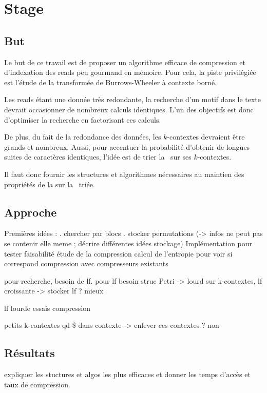 \section{Stage}

\subsection{But}
Le but de ce travail est de proposer un algorithme efficace de compression et d'indexation des reads peu gourmand en mémoire. Pour cela, la piste privilégiée est l'étude de la transformée de Burrows-Wheeler à contexte borné. 

Les reads étant une donnée très redondante, la recherche d'un motif dans le texte devrait occasionner de nombreux calculs identiques. L'un des objectifs est donc d'optimiser la recherche en factorisant ces calculs. 

De plus, du fait de la redondance des données, les $k$-contextes devraient être grands et nombreux. Aussi, pour accentuer la probabilité d'obtenir de longues suites de caractères identiques, l'idée est de trier la \kbwt\ sur ses $k$-contextes. 

Il faut donc fournir les structures et algorithmes nécessaires au maintien des propriétés de la \bwt sur la \kbwt\ triée.


\subsection{Approche}
Premières idées :
	. chercher par blocs
	. stocker permutations (-> infos ne peut pas se contenir elle meme ; décrire différentes idées stockage)
Implémentation pour tester faisabilité
étude de la compression
calcul de l'entropie pour voir si correspond
compression avec compresseurs existants

pour recherche, besoin de lf. pour lf besoin struc Petri -> lourd
sur k-contextes, lf croissante -> stocker lf ? mieux

lf lourde
essais compression

petits k-contextes qd \$ dans contexte -> enlever ces contextes ?
non

\subsection{Résultats} 

expliquer les stuctures et algos les plus efficaces et donner les temps d'accès et taux de compression.
